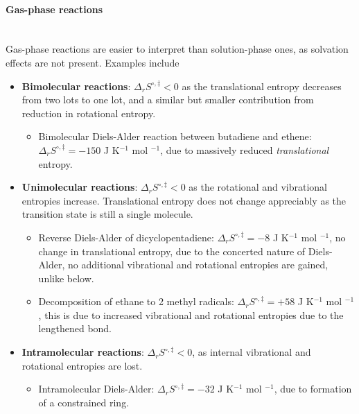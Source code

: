 \paragraph{Gas-phase reactions} ~\\
Gas-phase reactions are easier to interpret than solution-phase ones, as solvation effects are not present. Examples include
\begin{itemize}
  \item \textbf{Bimolecular reactions}: $\Delta_rS^{\circ,\ddag}<0$ as the translational entropy decreases from two lots to one lot, and a similar but smaller contribution from reduction in rotational entropy.
  \begin{itemize}
    \item Bimolecular Diels-Alder reaction between butadiene and ethene: $\Delta_rS^{\circ,\ddag}=-150$ J K$^{-1}$ mol $^{-1}$, due to massively reduced \emph{translational} entropy.
  \end{itemize}
  \item \textbf{Unimolecular reactions}: $\Delta_rS^{\circ,\ddag}<0$ as the rotational and vibrational entropies increase. Translational entropy does not change appreciably as the transition state is still a single molecule.
  \begin{itemize}
    \item  Reverse Diels-Alder of dicyclopentadiene: $\Delta_rS^{\circ,\ddag}=-8$ J K$^{-1}$ mol $^{-1}$, no change in translational entropy, due to the concerted nature of Diels-Alder, no additional vibrational and rotational entropies are gained, unlike below.
    \item Decomposition of ethane to 2 methyl radicals: $\Delta_rS^{\circ,\ddag}=+58$ J K$^{-1}$ mol $^{-1}$, this is due to increased vibrational and rotational entropies due to the lengthened bond.
  \end{itemize}
  \item \textbf{Intramolecular reactions}: $\Delta_rS^{\circ,\ddag}<0$, as internal vibrational and rotational entropies are lost.
  \begin{itemize}
    \item Intramolecular Diels-Alder: $\Delta_rS^{\circ,\ddag}=-32$ J K$^{-1}$ mol $^{-1}$, due to formation of a constrained ring.
  \end{itemize}
\end{itemize}

